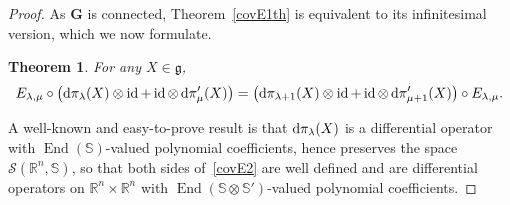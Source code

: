 \documentclass[pdftex]{sigma}
\DeclareMathOperator{\End}{End}
\DeclareMathOperator{\id}{id}
\numberwithin{equation}{section}
\newtheorem{theor}{Theorem}[section]
\begin{document}
\begin{proof}
As $\mathbf G$ is connected, Theorem~\ref{covE1th} is equivalent to its infinitesimal version, which we now formulate.

\begin{theor}\label{thcovE2}
 For any $X\in \mathfrak g$,
\begin{gather}\label{covE2}
E_{\lambda, \mu} \circ \big({{\rm d}}\pi_\lambda(X)\otimes \id+\id\otimes\, {{\rm d}}\pi'_\mu(X)\big)= \big({{\rm d}}\pi_{\lambda+1}(X)\otimes \id+\id\otimes\, {{\rm d}}\pi'_{\mu+1}(X)\big)\circ E_{\lambda, \mu}.
\end{gather}
\end{theor}
A well-known and easy-to-prove result is that ${{\rm d}}\pi_\lambda(X)$ is a differential operator with $\End(\mathbb S)$-valued polynomial coefficients, hence preserves the space $\mathcal S(\mathbb R^n, \mathbb S)$, so that both sides of~\eqref{covE2} are well defined and are differential operators on $\mathbb R^n\times \mathbb R^n$ with $\End(\mathbb S \otimes \mathbb S')$-valued polynomial coefficients.


\end{proof}
\end{document}
